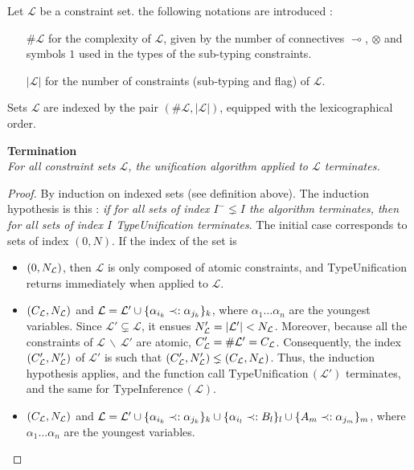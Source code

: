 \begin{defn} Let $\mathcal{L}$ be a constraint set. the following notations are introduced :
	\begin{itemize}
		\item[$\#\mathcal{L}$] for the complexity of $\mathcal{L}$, given by the number of connectives $\multimap$,
			$\otimes$ and symbols $1$ used in the types of the sub-typing constraints.
		\item[$|\mathcal{L}|$] for the number of constraints (sub-typing and flag) of $\mathcal{L}$.
	\end{itemize}
	Sets $\mathcal{L}$ are indexed by the pair $(\#\mathcal{L}, |\mathcal{L}|)$, equipped with the lexicographical order.
\end{defn}

\begin{thm}{\bf Termination} \\
	\textit{For all constraint sets $\mathcal{L}$, the unification algorithm applied to $\mathcal{L}$ terminates. }
	\begin{proof}
		By induction on indexed sets (see definition above). The induction hypothesis is this : \textit{if for all sets of index $I^{-} \lneq I$ the
		algorithm terminates, then for all sets of index $I$ TypeUnification terminates}. The initial case corresponds to sets of index $(0, N)$.
		If the index of the set is
		\begin{itemize}
			\item $(0, N_{\mathcal{L}})$, then $\mathcal{L}$ is only composed of atomic constraints, and TypeUnification returns
				immediately when applied to $\mathcal{L}$.
				
			\item $(C_{\mathcal{L}}, N_{\mathcal{L}})$ and $\mathcal{L} = \mathcal{L}' \cup \{ \alpha_{i_k} \prec: \alpha_{j_k} \}_k$, where $\alpha_1 \dots \alpha_n$ are
				the youngest variables. Since $\mathcal{L'} \subsetneq \mathcal{L}$, it ensues $N_{\mathcal{L}}' = |\mathcal{L'}| < N_{\mathcal{L}}$.
				Moreover, because all the constraints of $\mathcal{L} \,\backslash\, \mathcal{L'}$ are atomic, $C_{\mathcal{L}}' = \#\mathcal{L'} = C_{\mathcal{L}}$.
				Consequently, the index $(C_{\mathcal{L}}', N_{\mathcal{L}}')$ of $\mathcal{L'}$ is such that $(C_{\mathcal{L}}', N_{\mathcal{L}}') \lneq (C_{\mathcal{L}}, N_{\mathcal{L}})$.
				Thus, the induction hypothesis applies, and the function call $\text{TypeUnification}\,(\mathcal{L'})$ terminates, and the same
				for $\text{TypeInference}\,(\mathcal{L})$.
			
			\item $(C_{\mathcal{L}}, N_{\mathcal{L}})$ and $\mathcal{L} = \mathcal{L}' \cup \{ \alpha_{i_k} \prec: \alpha_{j_k} \}_k \cup \{ \alpha_{i_l} \prec: B_l \}_l
				\cup \{ A_m \prec: \alpha_{j_m} \}_m$, where $\alpha_1 \dots \alpha_n$ are the youngest variables.


\end{itemize}
\end{proof}
\end{thm}
